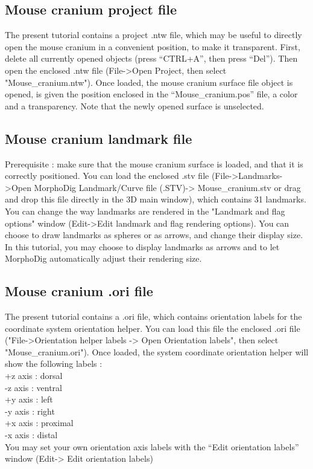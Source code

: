 \documentclass[12pt, a4paper]{book}
\begin{document}
\subsection{Mouse cranium project file}
The present tutorial contains a project .ntw file, which may be useful to directly open the mouse
cranium in a convenient position, to make it transparent. First, delete all currently opened objects
(press “CTRL+A”, then press “Del”). Then open the enclosed .ntw file (File->Open Project, then select
"Mouse\_cranium.ntw"). Once loaded, the mouse cranium surface file object is opened, is given the position
enclosed in the “Mouse\_cranium.pos” file, a color and a transparency. Note that the newly opened
surface is unselected.



\subsection{Mouse cranium landmark file}
Prerequisite : make sure that the mouse cranium surface is loaded, and that it is correctly positioned. You
can load the enclosed .stv file (File->Landmarks->Open MorphoDig Landmark/Curve file (.STV)-> Mouse\_cranium.stv or drag and drop this file directly in the 3D main window), which contains 31 landmarks. You can change the way landmarks are rendered in the "Landmark and flag options" window
(Edit->Edit landmark and flag rendering options). You can choose to draw landmarks as spheres or as arrows, and change
their display size. In this tutorial, you may choose to display landmarks as arrows and to let MorphoDig automatically adjust their rendering size.

\subsection{Mouse cranium .ori file}
The present tutorial contains a .ori file, which contains orientation labels for the coordinate system
orientation helper. You can load this file the enclosed .ori file ("File->Orientation helper labels -> Open Orientation labels", then select
"Mouse\_cranium.ori"). Once loaded, the system coordinate orientation helper will show the following
labels :\\
+z axis : dorsal\\
-z axis : ventral\\
+y axis : left\\
-y axis : right\\
+x axis : proximal\\
-x axis : distal\\
You may set your own orientation axis labels with the “Edit orientation labels” window (Edit-> Edit orientation labels)
\end{document}
